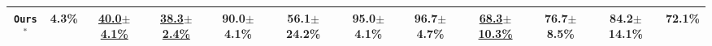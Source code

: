 \begin{table}[H]
\begin{adjustbox}{max width=\textwidth}
\begin{tabular}{cccccc|cccccc}
  \rowcolor{hclbrown!15!white}
  \texttt{Ours}$^{*}$
  & \textbf{4.3\%}
  & \underline{40.0$\pm$4.1\%}
  & \underline{38.3$\pm$2.4\%}
  & \textbf{90.0$\pm$4.1\%}
  & \textbf{56.1$\pm$24.2\%}
  & \textbf{95.0$\pm$4.1\%}
  & \textbf{96.7$\pm$4.7\%}
  & \underline{68.3$\pm$10.3\%}
  & \textbf{76.7$\pm$8.5\%}
  & \textbf{84.2$\pm$14.1\%}   & \textbf{72.1\%} \\



  \bottomrule
  \end{tabular}
  \end{adjustbox}
\end{table}
